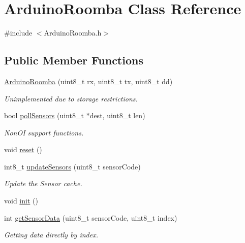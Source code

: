\hypertarget{class_arduino_roomba}{
\section{ArduinoRoomba Class Reference}
\label{class_arduino_roomba}
}


{\ttfamily \#include $<$ArduinoRoomba.h$>$}

\subsection*{Public Member Functions}
\begin{DoxyCompactItemize}
\item 
\hyperlink{class_arduino_roomba_a1d2d90be27636ee06a71e3668b823963}{ArduinoRoomba} (uint8\_\-t rx, uint8\_\-t tx, uint8\_\-t dd)
\begin{DoxyCompactList}\small\item\em Unimplemented due to storage restrictions. \item\end{DoxyCompactList}\item 
bool \hyperlink{class_arduino_roomba_ac534f7f31042a034873264b6c0ebf0ad}{pollSensors} (uint8\_\-t $\ast$dest, uint8\_\-t len)
\begin{DoxyCompactList}\small\item\em NonOI support functions. \item\end{DoxyCompactList}\item 
void \hyperlink{class_arduino_roomba_a03f560265530b2dde866f111c547a271}{reset} ()
\item 
int8\_\-t \hyperlink{class_arduino_roomba_ad8e8719dd8ad39d5901a0420843fdd59}{updateSensors} (uint8\_\-t sensorCode)
\begin{DoxyCompactList}\small\item\em Update the Sensor cache. \item\end{DoxyCompactList}\item 
void \hyperlink{class_arduino_roomba_aadba64a13567fb15be83d7b610944bfc}{init} ()
\item 
int \hyperlink{class_arduino_roomba_a75096725ea2a9849a541f953b12c7a22}{getSensorData} (uint8\_\-t sensorCode, uint8\_\-t index)
\begin{DoxyCompactList}\small\item\em Getting data directly by index. \item\end{DoxyCompactList}\item 

\end{DoxyCompactItemize}
